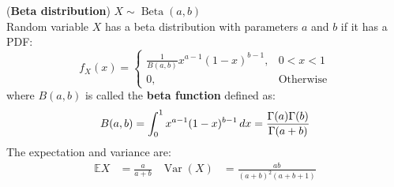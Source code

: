 \documentclass{huhtakm-template-book}
\newcommand{\expect}{\mathbb{E}}
\DeclareMathOperator{\Beta}{Beta}
\DeclareMathOperator{\Var}{Var}
\begin{document}
\begin{eg}(\textbf{Beta distribution}) $X\sim\Beta(a,b)$\\
	Random variable $X$ has a beta distribution with parameters $a$ and $b$ if it has a PDF:
	\begin{equation*}
		f_{X}(x)=\begin{cases}
			\frac{1}{B(a,b)}x^{a-1}(1-x)^{b-1}, &0<x<1\\
			0, &\text{Otherwise}
		\end{cases}
	\end{equation*}
	where $B(a,b)$ is called the \textbf{beta function} defined as:
	\begin{equation*}
		B(a,b)=\int_{0}^{1}x^{a-1}(1-x)^{b-1}\,dx=\frac{\Gamma(a)\Gamma(b)}{\Gamma(a+b)}
	\end{equation*}
	The expectation and variance are:
	\begin{align*}
		\expect{X}&=\frac{a}{a+b} & \Var(X)&=\frac{ab}{(a+b)^{2}(a+b+1)}
	\end{align*}
\end{eg}


\newpage
\end{document}
